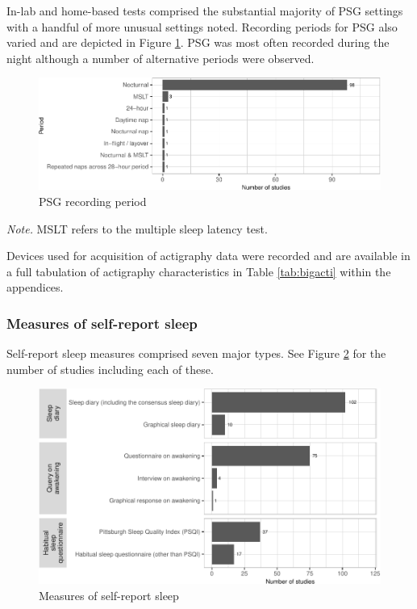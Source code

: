 \documentclass[
]{article}
\begin{document}
In-lab and home-based tests comprised the substantial majority of PSG settings with a handful of more unusual settings noted. Recording periods for PSG also varied and are depicted in Figure \ref{fig:period}. PSG was most often recorded during the night although a number of alternative periods were observed.

\begin{figure}
\centering
\includegraphics{review_markdown_files/figure-latex/period-1.pdf}
\caption{\label{fig:period}PSG recording period}
\end{figure}

\emph{Note.} MSLT refers to the multiple sleep latency test.

Devices used for acquisition of actigraphy data were recorded and are available in a full tabulation of actigraphy characteristics in Table \ref{tab:bigacti} within the appendices.

\subsubsection{Measures of self-report sleep}\label{measures-of-self-report-sleep}

Self-report sleep measures comprised seven major types. See Figure \ref{fig:srmeasure} for the number of studies including each of these.

\begin{figure}
\centering
\includegraphics{review_markdown_files/figure-latex/srmeasure-1.pdf}
\caption{\label{fig:srmeasure}Measures of self-report sleep}
\end{figure}
\end{document}
